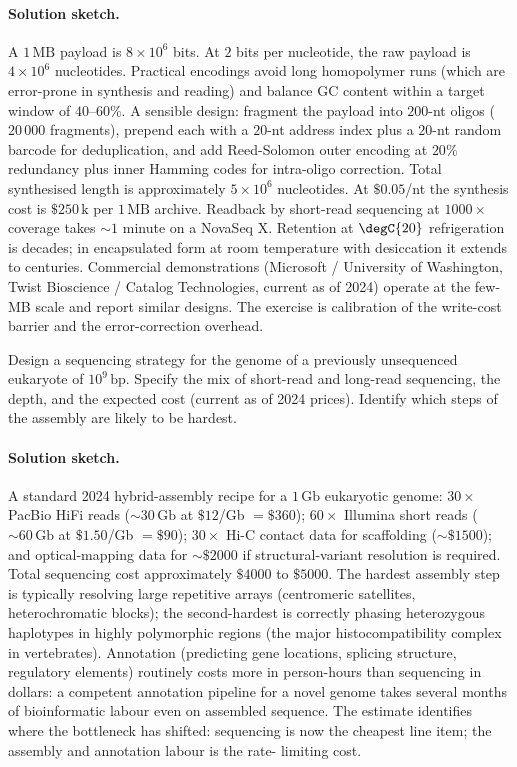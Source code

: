 \paragraph{Solution sketch.} A $1\,\text{MB}$ payload is
$8 \times 10^6$ bits. At $2$ bits per nucleotide, the raw payload is
$4 \times 10^6$ nucleotides. Practical encodings avoid long
homopolymer runs (which are error-prone in synthesis and reading)
and balance GC content within a target window of $40$--$60\%$. A
sensible design: fragment the payload into $200$-nt oligos
($20\,000$ fragments), prepend each with a $20$-nt address index
plus a $20$-nt random barcode for deduplication, and add Reed-Solomon
outer encoding at $20\%$ redundancy plus inner Hamming codes for
intra-oligo correction. Total synthesised length is approximately
$5 \times 10^6$ nucleotides. At $\$0.05$/nt the synthesis cost is
$\$250\,\text{k}$ per $1\,\text{MB}$ archive. Readback by short-read
sequencing at $1000 \times$ coverage takes $\sim 1$ minute on a
NovaSeq X. Retention at $\degC{20}$ refrigeration is decades; in
encapsulated form at room temperature with desiccation it extends
to centuries. Commercial demonstrations (Microsoft / University of
Washington, Twist Bioscience / Catalog Technologies, current as of
2024) operate at the few-MB scale and report similar designs. The
exercise is calibration of the write-cost barrier and the
error-correction overhead.

\begin{exercise}
Design a sequencing strategy for the genome of a previously
unsequenced eukaryote of $10^9\,\text{bp}$. Specify the mix of
short-read and long-read sequencing, the depth, and the expected
cost (current as of 2024 prices). Identify which steps of the
assembly are likely to be hardest.
\end{exercise}

\paragraph{Solution sketch.} A standard 2024 hybrid-assembly recipe
for a $1\,\text{Gb}$ eukaryotic genome: $30\times$ PacBio HiFi reads
($\sim 30\,\text{Gb}$ at $\$12$/Gb $= \$360$); $60\times$ Illumina
short reads ($\sim 60\,\text{Gb}$ at $\$1.50$/Gb $= \$90$);
$30\times$ Hi-C contact data for scaffolding ($\sim \$1500$); and
optical-mapping data for $\sim \$2000$ if structural-variant
resolution is required. Total sequencing cost approximately
$\$4000$ to $\$5000$. The hardest assembly step is typically
resolving large repetitive arrays (centromeric satellites,
heterochromatic blocks); the second-hardest is correctly phasing
heterozygous haplotypes in highly polymorphic regions (the major
histocompatibility complex in vertebrates). Annotation (predicting
gene locations, splicing structure, regulatory elements) routinely
costs more in person-hours than sequencing in dollars: a competent
annotation pipeline for a novel genome takes several months of
bioinformatic labour even on assembled sequence. The estimate
identifies where the bottleneck has shifted: sequencing is now the
cheapest line item; the assembly and annotation labour is the rate-
limiting cost.

